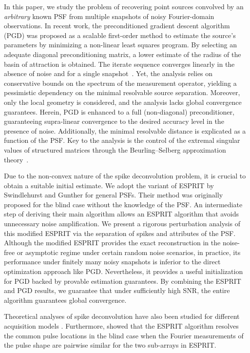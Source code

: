 \documentclass[conference,english]{IEEEtran}
\begin{document}
In this paper, we study the problem of recovering point sources convolved by an \emph{arbitrary} known PSF from multiple snapshots of noisy Fourier-domain observations.
In recent work, the preconditioned gradient descent algorithm (PGD) was proposed as a scalable first-order method to estimate the source's parameters by minimizing a non-linear least squares program. By selecting an adequate diagonal preconditioning matrix, a lower estimate of the radius of the basin of attraction is obtained. The iterate sequence converges linearly in the absence of noise and for a single snapshot~\cite{ferreiradacosta2023LocalGeometry,gabet2024preconditioned}. Yet, the analysis relies on conservative bounds on the spectrum of the measurement operator, yielding a pessimistic dependency on the minimal resolvable source separation. Moreover, only the local geometry is considered, and the analysis lacks global convergence guarantees. Herein, PGD is enhanced to a full (non-diagonal) preconditioner, guaranteeing supra-linear convergence to the desired accuracy level in the presence of noise. Additionally, the minimal resolvable distance is explicated as a function of the PSF. Key to the analysis is the control of the extremal singular values of structured matrices through the Beurling--Selberg approximation theory~\cite{vaaler1985some,ferreira2023second}.

Due to the non-convex nature of the spike deconvolution problem, it is crucial to obtain a suitable initial estimate. We adopt the variant of ESPRIT by Swindlehurst and Gunther \cite{swindlehurst1999methods} for general PSFs. 
Their method was originally proposed for the blind case without the knowledge of the PSF. An intermediate step of deriving their main algorithm allows an ESPRIT algorithm that avoids unnecessary noise amplification. 
We present a rigorous perturbation analysis of this modified ESPRIT via the separation of spikes and attributes of the PSF. 
Although the modified ESPRIT provides the exact reconstruction in the noise-free or asymptotic regime under certain random noise scenarios, in practice, its performance under finitely many noisy snapshots is inferior to the direct optimization approach like PGD. Nevertheless, it provides a useful initialization for PGD backed by provable estimation guarantees. 
By combining the ESPRIT and PGD results, we guarantee that under sufficiently high SNR, the entire algorithm guarantees global convergence. 

Theoretical analyses of spike deconvolution have also been studied for different acquisition models \cite{bernstein2019deconvolution,traonmilin2020basins,traonmilin2024strong}. 
Furthermore, \cite{bresler1989resolution,kalra2024stable} showed that the ESPRIT algorithm resolves the common pulse locations in the blind case when the Fourier measurements of the pulse shape are pairwise similar for the two sub-arrays in ESPRIT. 
\end{document}
